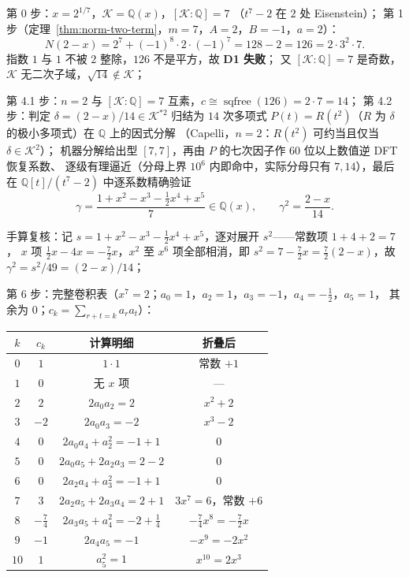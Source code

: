 \documentclass[UTF8,a4paper,11pt]{ctexart}
\begin{document}
第 0 步：$x=2^{1/7}$，$\mathscr{K}=\mathbb{Q}(x)$，$[\mathscr{K}:\mathbb{Q}]=7$
（$t^7-2$ 在 $2$ 处 Eisenstein）；
第 1 步（定理~\ref{thm:norm-two-term}，$m=7$，$A=2$，$B=-1$，$a=2$）：
\[
N(2-x)=2^7+(-1)^8\cdot2\cdot(-1)^7=128-2=126=2\cdot3^2\cdot7 .
\]
指数 $1$ 与 $1$ 不被 $2$ 整除，$126$ 不是平方，故 \textbf{D1 失败}；
又 $[\mathscr{K}:\mathbb{Q}]=7$ 是奇数，$\mathscr{K}$ 无二次子域，$\sqrt{14}\notin\mathscr{K}$；\par

第 4.1 步：$n=2$ 与 $[\mathscr{K}:\mathbb{Q}]=7$ 互素，$c\cong\operatorname{sqfree}(126)=2\cdot7=14$；
第 4.2 步：判定 $\delta=(2-x)/14\in\mathscr{K}^{*2}$ 归结为 $14$ 次多项式
$P(t)=R(t^2)$（$R$ 为 $\delta$ 的极小多项式）在 $\mathbb{Q}$ 上的因式分解
（Capelli，$n=2$：$R(t^2)$ 可约当且仅当 $\delta\in\mathscr{K}^2$）；
机器分解给出型 $[7,7]$，再由 $P$ 的七次因子作 $60$ 位以上数值逆 DFT 恢复系数、
逐级有理逼近（分母上界 $10^6$ 内即命中，实际分母只有 $7,14$），最后在
$\mathbb{Q}[t]/(t^7-2)$ 中逐系数精确验证
\[
\gamma=\frac{1+x^2-x^3-\tfrac12x^4+x^5}{7}\in\mathbb{Q}(x),
\qquad \gamma^2=\frac{2-x}{14}.
\]

手算复核：记 $s=1+x^2-x^3-\tfrac12x^4+x^5$，逐对展开 $s^2$——常数项 $1+4+2=7$，
$x$ 项 $\tfrac12x-4x=-\tfrac72x$，$x^2$ 至 $x^6$ 项全部相消，即
$s^2=7-\tfrac72x=\tfrac72(2-x)$，故 $\gamma^2=s^2/49=(2-x)/14$；\par

第 6 步：完整卷积表（$x^7=2$；$a_0=1$，$a_2=1$，$a_3=-1$，$a_4=-\tfrac12$，$a_5=1$，
其余为 $0$；$c_k=\sum_{r+t=k}a_ra_t$）：\par

\begin{center}
\begin{tabular}{@{}cccc@{}}
\toprule
$k$ & $c_k$ & 计算明细 & 折叠后 \\
\midrule
$0$ & $1$ & $1\cdot1$ & 常数 $+1$ \\
$1$ & $0$ & 无 $x$ 项 & --- \\
$2$ & $2$ & $2a_0a_2=2$ & $x^2+2$ \\
$3$ & $-2$ & $2a_0a_3=-2$ & $x^3-2$ \\
$4$ & $0$ & $2a_0a_4+a_2^2=-1+1$ & $0$ \\
$5$ & $0$ & $2a_0a_5+2a_2a_3=2-2$ & $0$ \\
$6$ & $0$ & $2a_2a_4+a_3^2=-1+1$ & $0$ \\
$7$ & $3$ & $2a_2a_5+2a_3a_4=2+1$ & $3x^7=6$，常数 $+6$ \\
$8$ & $-\tfrac74$ & $2a_3a_5+a_4^2=-2+\tfrac14$ & $-\tfrac74x^8=-\tfrac72x$ \\
$9$ & $-1$ & $2a_4a_5=-1$ & $-x^9=-2x^2$ \\
$10$ & $1$ & $a_5^2=1$ & $x^{10}=2x^3$ \\
\bottomrule
\end{tabular}
\end{center}
\end{document}
